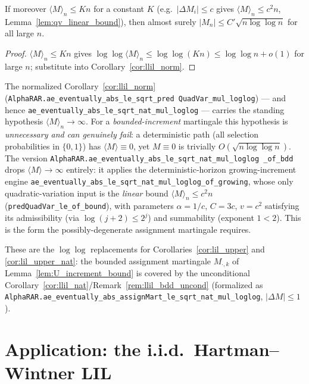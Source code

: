 \begin{corollary}\label{cor:llil_nat}
\leanok
{}
If moreover $\langle M\rangle_n\le K n$ for a constant $K$ (e.g.\ $|\Delta M_i|\le c$
gives $\langle M\rangle_n\le c^2 n$, Lemma~\ref{lem:qv_linear_bound}), then almost
surely $|M_n|\le C'\sqrt{n\log\log n}$ for all large $n$.
\end{corollary}
\begin{proof}\leanok
$\langle M\rangle_n\le Kn$ gives $\log\log\langle M\rangle_n\le\log\log(Kn)\le
\log\log n+o(1)$ for large $n$; substitute into Corollary~\ref{cor:llil_norm}.
\end{proof}

\begin{remark}\label{rem:llil_bdd_uncond}
The normalized Corollary~\ref{cor:llil_norm} (\texttt{AlphaRAR.ae\_eventually\_abs\_le\_sqrt\_pred%
QuadVar\_mul\_loglog}) --- and hence \texttt{ae\_eventually\_abs\_le\_sqrt\_nat\_mul\_loglog} ---
carries the standing hypothesis $\langle M\rangle_n\to\infty$. For a \emph{bounded-increment}
martingale this hypothesis is \emph{unnecessary and can genuinely fail}: a deterministic path (all
selection probabilities in $\{0,1\}$) has $\langle M\rangle\equiv0$, yet $M\equiv0$ is trivially
$O(\sqrt{n\log\log n})$. The version \texttt{AlphaRAR.ae\_eventually\_abs\_le\_sqrt\_nat\_mul\_loglog%
\_of\_bdd} drops $\langle M\rangle\to\infty$ entirely: it applies the deterministic-horizon
growing-increment engine \texttt{ae\_eventually\_abs\_le\_sqrt\_nat\_mul\_loglog\_of\_growing}, whose
only quadratic-variation input is the \emph{linear} bound $\langle M\rangle_n\le c^2n$
(\texttt{predQuadVar\_le\_of\_bound}), with parameters $\alpha=1/c$, $C=3c$, $v=c^2$ satisfying its
admissibility (via $\log(j+2)\le 2^j$) and summability (exponent $1<2$). This is the form the
possibly-degenerate assignment martingale requires.
\end{remark}

These are the $\log\log$ replacements for Corollaries~\ref{cor:lil_upper} and
\ref{cor:lil_upper_nat}: the bounded assignment martingale $M_{\cdot,k}$ of
Lemma~\ref{lem:U_increment_bound} is covered by the unconditional
Corollary~\ref{cor:llil_nat}/Remark~\ref{rem:llil_bdd_uncond} (formalized as
\texttt{AlphaRAR.ae\_eventually\_abs\_assignMart\_le\_sqrt\_nat\_mul\_loglog}, $|\Delta M|\le1$).

\section{Application: the i.i.d.\ Hartman--Wintner LIL}
\label{sec:llil_hw}

